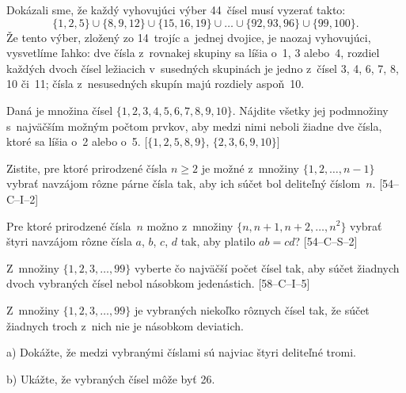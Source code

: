 {Dokázali sme, že každý vyhovujúci výber 44~čísel musí vyzerať takto:
$$
\{1,2,5\}\cup\{8,9,12\}\cup\{15,16,19\}\cup\dots\cup
\{92,93,96\}\cup\{99,100\}.
$$
Že tento výber, zložený zo 14~trojíc a~jednej dvojice, je naozaj
vyhovujúci, vysvetlíme ľahko: dve čísla z~rovnakej skupiny sa líšia
o~1, 3 alebo~4, rozdiel každých dvoch čísel ležiacich
v~susedných skupinách je jedno z~čísel 3, 4, 6, 7, 8, 10 či~11;
čísla z~nesusedných skupín majú rozdiely aspoň~10.


Daná je množina čísel $\{1,2,3,4,5,6,7,8,9,10\}$. Nájdite všetky
jej podmnožiny s~najväčším možným počtom prvkov, aby medzi nimi neboli
žiadne dve čísla, ktoré sa líšia o~2 alebo o~5.
[$\{1,2,5,8,9\}$, $\{2,3,6,9,10\}$]

Zistite, pre ktoré prirodzené čísla $n\ge2$ je možné z~množiny
$\{1,2,\dots,n-1\}$ vybrať navzájom rôzne párne čísla
tak, aby ich súčet bol deliteľný číslom~$n$.
[54--C--I--2]

Pre ktoré prirodzené čísla~$n$ možno z~množiny
$\{n, n + 1, n + 2,\dots, n^2\}$ vybrať štyri navzájom rôzne
čísla $a$, $b$, $c$, $d$ tak, aby platilo  $ab = cd$?
[54--C--S--2]

Z~množiny $\{1,2,3,\dots,99\}$ vyberte čo najväčší počet
čísel tak, aby súčet žiadnych dvoch vybraných čísel nebol násobkom
jedenástich.
[58--C--I--5]

Z~množiny $\{1,2,3,\dots,99\}$ je vybraných niekoľko rôznych čísel tak, že súčet žiadnych troch z~nich nie je násobkom deviatich.
\item{a)} Dokážte, že medzi vybranými číslami sú najviac štyri deliteľné tromi.
\item{b)} Ukážte, že vybraných čísel môže byť 26.\endgraf
[58--C--II--3]
}

